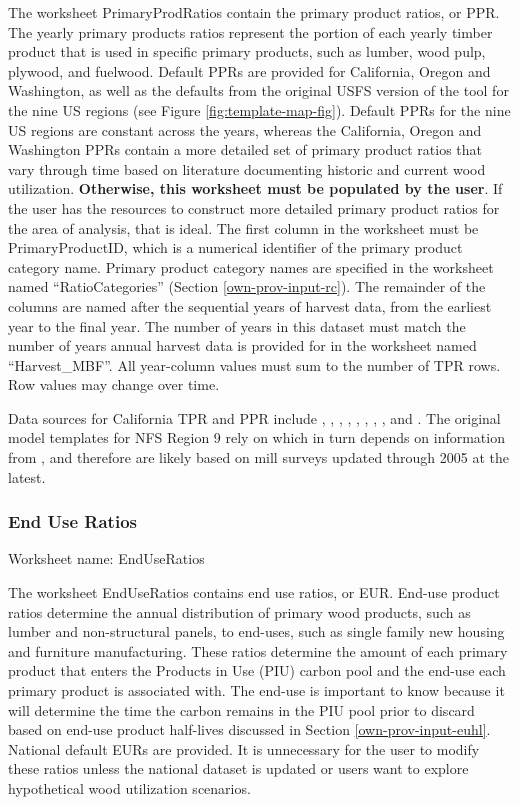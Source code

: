 \documentclass[
  openany]{book}
\begin{document}
The worksheet PrimaryProdRatios contain the primary product ratios, or PPR. The yearly primary products ratios represent the portion of each yearly timber product that is used in specific primary products, such as lumber, wood pulp, plywood, and fuelwood. Default PPRs are provided for California, Oregon and Washington, as well as the defaults from the original USFS version of the tool for the nine US regions (see Figure \ref{fig:template-map-fig}). Default PPRs for the nine US regions are constant across the years, whereas the California, Oregon and Washington PPRs contain a more detailed set of primary product ratios that vary through time based on literature documenting historic and current wood utilization. \textbf{Otherwise, this worksheet must be populated by the user}. If the user has the resources to construct more detailed primary product ratios for the area of analysis, that is ideal. The first column in the worksheet must be PrimaryProductID, which is a numerical identifier of the primary product category name. Primary product category names are specified in the worksheet named ``RatioCategories'' (Section \ref{own-prov-input-rc}). The remainder of the columns are named after the sequential years of harvest data, from the earliest year to the final year. The number of years in this dataset must match the number of years annual harvest data is provided for in the worksheet named ``Harvest\_MBF''. All year-column values must sum to the number of TPR rows. Row values may change over time.

Data sources for California TPR and PPR include \textcite{barrette1970}, \textcite{hiserote1978}, \textcite{howard1974}, \textcite{marcille2020}, \textcite{mciver2015}, \textcite{morgan2004}, \textcite{morgan2012}, \textcite{ward1995}, and \textcite{ward1997}. The original model templates for NFS Region 9 rely on \textcite{smith2006} which in turn depends on information from \textcite{adams2006}, and therefore are likely based on mill surveys updated through 2005 at the latest.

\hypertarget{own-prov-input-eur}{%
\subsubsection{End Use Ratios}\label{own-prov-input-eur}}

Worksheet name: EndUseRatios

The worksheet EndUseRatios contains end use ratios, or EUR. End-use product ratios determine the annual distribution of primary wood products, such as lumber and non-structural panels, to end-uses, such as single family new housing and furniture manufacturing. These ratios determine the amount of each primary product that enters the Products in Use (PIU) carbon pool and the end-use each primary product is associated with. The end-use is important to know because it will determine the time the carbon remains in the PIU pool prior to discard based on end-use product half-lives discussed in Section \ref{own-prov-input-euhl}. National default EURs are provided. It is unnecessary for the user to modify these ratios unless the national dataset is updated or users want to explore hypothetical wood utilization scenarios.
\end{document}
